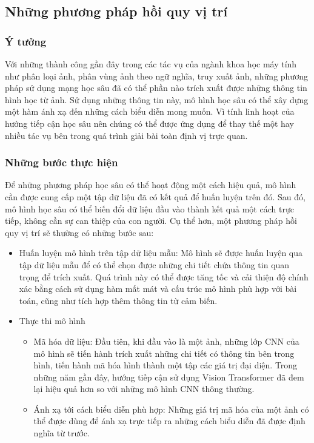 \subsection{Những phương pháp hồi quy vị trí}
\subsubsection*{Ý tưởng}
Với những thành công gần đây trong các tác vụ của ngành khoa học máy tính như phân loại ảnh, phân vùng ảnh theo ngữ nghĩa, truy xuất ảnh, những phương pháp sử dụng mạng học sâu đã có thể phần nào trích xuất được những thông tin hình học từ ảnh. Sử dụng những thông tin này, mô hình học sâu có thể xây dựng một hàm ánh xạ đến những cách biểu diễn mong muốn. Vì tính linh hoạt của hướng tiếp cận học sâu nên chúng có thể được ứng dụng để thay thế một hay nhiều tác vụ bên trong quá trình giải bài toàn định vị trực quan.
\subsubsection*{Những bước thực hiện}

Để những phương pháp học sâu có thể hoạt động một cách hiệu quả, mô hình cần được cung cấp một tập dữ liệu đã có kết quả để huấn luyện trên đó. Sau đó, mô hình học sâu có thể biến đổi dữ liệu đầu vào thành kết quả một cách trực tiếp, không cần sự can thiệp của con người. Cụ thể hơn, một phương pháp hồi quy vị trí sẽ thường có những bước sau:
\begin{itemize}
    \item Huấn luyện mô hình trên tập dữ liệu mẫu: Mô hình sẽ được huấn luyện qua tập dữ liệu mẫu để có thể chọn được những chi tiết chứa thông tin quan trọng để trích xuất. Quá trình này có thể được tăng tốc và cải thiện độ chính xác bằng cách sử dụng hàm mất mát và cấu trúc mô hình phù hợp với bài toán, cũng như tích hợp thêm thông tin từ cảm biến.
    \item Thực thi mô hình
          \begin{itemize}
              \item Mã hóa dữ liệu: Đầu tiên, khi đầu vào là một ảnh, những lớp CNN của mô hình sẽ tiến hành trích xuất những chi tiết có thông tin bên trong hình, tiến hành mã hóa hình thành một tập các giá trị đại diện. Trong những năm gần đây, hướng tiếp cận sử dụng Vision Transformer đã đem lại hiệu quả hơn so với những mô hình CNN thông thường.
              \item Ánh xạ tới cách biểu diễn phù hợp: Những giá trị mã hóa của một ảnh có thể được dùng để ánh xạ trực tiếp ra những cách biểu diễn đã được định nghĩa từ trước.
          \end{itemize}
\end{itemize}

